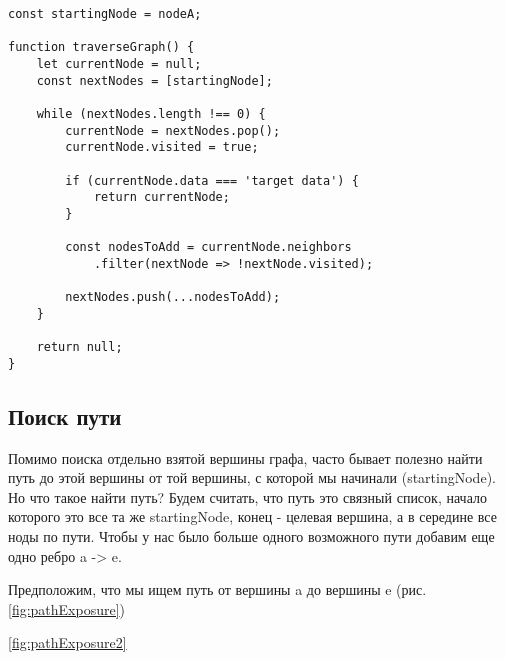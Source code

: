 \documentclass[../article.tex]{subfiles}
\begin{document}
\begin{figure*}
    \begin{ruledelement}
        \begin{lstlisting}[caption={Обход графа в глубину}, label={lst:graphDfs}]
const startingNode = nodeA;

function traverseGraph() {
    let currentNode = null;
    const nextNodes = [startingNode];

    while (nextNodes.length !== 0) {
        currentNode = nextNodes.pop();
        currentNode.visited = true;

        if (currentNode.data === 'target data') {
            return currentNode;
        }

        const nodesToAdd = currentNode.neighbors
            .filter(nextNode => !nextNode.visited);

        nextNodes.push(...nodesToAdd);
    }

    return null;
}
        \end{lstlisting}
    \end{ruledelement}

\end{figure*}

\subsection{Поиск пути}

Помимо поиска отдельно взятой вершины графа, часто бывает полезно найти путь до этой вершины от той вершины, с которой мы начинали ({\firacodebold startingNode}). Но что такое найти путь? Будем считать, что путь это связный список, начало которого это все та же {\firacodebold startingNode}, конец - целевая вершина, а в середине все ноды по пути. Чтобы у нас было больше одного возможного пути добавим еще одно ребро {\firacodebold a -> e}.

Предположим, что мы ищем путь от вершины {\firacodebold a} до вершины {\firacodebold e} (рис. \ref{fig:pathExposure})

\ref{fig:pathExposure2}

\begin{figure*}
\end{figure*}
\end{document}
